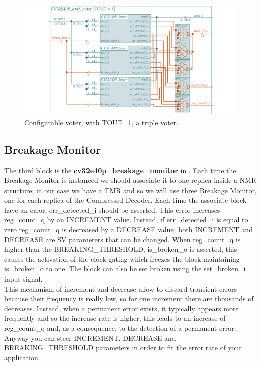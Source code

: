 {{{    	    \begin{figure}[H]
        		\centering
        		\includegraphics[width=1.3\textwidth,center]{./images/cv32e40p_conf_voter_tout1.png}
        		\caption{Configurable voter, with TOUT=1, a triple voter.}
        		\label{fig:cv32e40p_conf_voter_tout1}
        	\end{figure} 	
    	
    	}%
    	
    	\subsection{Breakage Monitor}{
    	    The third block is the \textbf{cv32e40p\_breakage\_monitor} in . 
    	    Each time the  Breakage Monitor is instanced we should associate it to one replica inside a NMR structure; in our case we have a TMR and so we will use three Breakage Monitor, one for each replica of the Compressed Decoder.
    	    Each time the associate block have an error, err\_detected\_i should be asserted. This error increases reg\_count\_q by an INCREMENT value.
    	    Instead, if err\_detected\_i is equal to zero reg\_count\_q is decreased by a DECREASE value; both INCREMENT and DECREASE are SV parameters that can be changed.
    	    When reg\_count\_q is higher than the  BREAKING\_THRESHOLD, is\_broken\_o is asserted, this causes the activation of the clock gating which freezes the block maintaining is\_broken\_o to one. The block can also be set broken using the set\_broken\_i input signal.\\
    	    
    	    This mechanism of increment and decrease allow to discard transient errors because their frequency is really low, so for one increment there are thousands of decreases. 
    	    Instead, when a permanent error exists, it typically appears more frequently and so the increase rate is higher, this leads to an increase of reg\_count\_q and, as a consequence, to the detection of a permanent error. 
    	    Anyway you can steer INCREMENT, DECREASE and BREAKING\_THRESHOLD parameters in order to fit the error rate of your application. 
    	    
}}}
